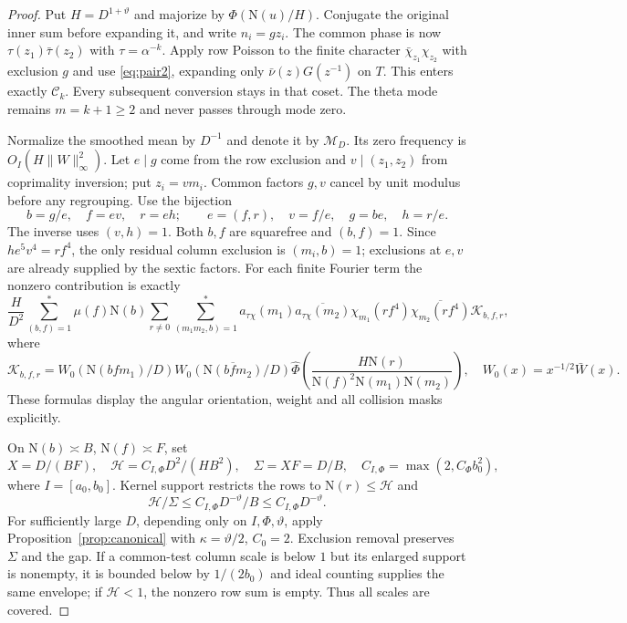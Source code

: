 \documentclass[11pt,a4paper]{article}
\numberwithin{equation}{section}
\theoremstyle{definition}
\theoremstyle{remark}
\newcommand{\N}{\mathrm N}
\newcommand{\wt}{\widehat}
\begin{document}
\begin{proof}
Put $H=D^{1+\vartheta}$ and majorize by $\Phi(\N(u)/H)$. Conjugate the original inner sum before expanding it, and write $n_i=gz_i$. The common phase is now $\tau(z_1)\bar\tau(z_2)$ with $\tau=\alpha^{-k}$. Apply row Poisson to the finite character $\bar\chi_{z_1}\chi_{z_2}$ with exclusion $g$ and use \eqref{eq:pair2}, expanding only $\bar\nu(z)G(z^{-1})$ on $T$. This enters exactly $\mathscr C_k$. Every subsequent conversion stays in that coset. The theta mode remains $m=k+1\ge2$ and never passes through mode zero.

Normalize the smoothed mean by $D^{-1}$ and denote it by $\mathcal M_D$. Its zero frequency is $O_I(H\|W\|_\infty^2)$. Let $e\mid g$ come from the row exclusion and $v\mid(z_1,z_2)$ from coprimality inversion; put $z_i=vm_i$. Common factors $g,v$ cancel by unit modulus before any regrouping. Use the bijection
\[
 b=g/e,\quad f=ev,\quad r=eh;\qquad
 e=(f,r),\quad v=f/e,\quad g=be,\quad h=r/e.
\]
The inverse uses $(v,h)=1$. Both $b,f$ are squarefree and $(b,f)=1$. Since $he^5v^4=rf^4$, the only residual column exclusion is $(m_i,b)=1$; exclusions at $e,v$ are already supplied by the sextic factors. For each finite Fourier term the nonzero contribution is exactly
\begin{equation}\label{eq:initform}
 \frac H{D^2}\sum_{(b,f)=1}^{*}\mu(f)\N(b)\sum_{r\ne0}
 \sum_{(m_1m_2,b)=1}^{*}a_{\tau\chi}(m_1)\overline{a_{\tau\chi}(m_2)}
 \chi_{m_1}(rf^4)\overline{\chi_{m_2}(rf^4)}\mathcal K_{b,f,r},
\end{equation}
where
\[
 \mathcal K_{b,f,r}=W_0(\N(bfm_1)/D)\overline{W_0(\N(bfm_2)/D)}
 \wt\Phi\left(\frac{H\N(r)}{\N(f)^2\N(m_1)\N(m_2)}\right),\quad
 W_0(x)=x^{-1/2}\bar W(x).
\]
These formulas display the angular orientation, weight and all collision masks explicitly.

On $\N(b)\asymp B$, $\N(f)\asymp F$, set
\[
 X=D/(BF),\quad \mathcal H=C_{I,\Phi}D^2/(HB^2),\quad
 \Sigma=XF=D/B,\quad C_{I,\Phi}=\max(2,C_\Phi b_0^2),
\]
where $I=[a_0,b_0]$. Kernel support restricts the rows to $\N(r)\le\mathcal H$ and
\[
 \mathcal H/\Sigma\le C_{I,\Phi}D^{-\vartheta}/B\le C_{I,\Phi}D^{-\vartheta}.
\]
For sufficiently large $D$, depending only on $I,\Phi,\vartheta$, apply Proposition~\ref{prop:canonical} with $\kappa=\vartheta/2$, $C_0=2$. Exclusion removal preserves $\Sigma$ and the gap. If a common-test column scale is below $1$ but its enlarged support is nonempty, it is bounded below by $1/(2b_0)$ and ideal counting supplies the same envelope; if $\mathcal H<1$, the nonzero row sum is empty. Thus all scales are covered.


\end{proof}
\end{document}
